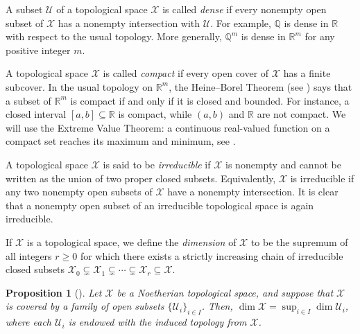 \documentclass[a4,12pt]{amsart}
\numberwithin{equation}{section} %
\newtheorem{proposition}[theorem]{Proposition} %
\theoremstyle{definition} %
\begin{document}
A subset $\mathcal{U}$ of a topological space $\mathcal{X}$ is called \emph{dense} if every nonempty open subset of $\mathcal{X}$ has a nonempty intersection with $\mathcal{U}$. For example, $\mathbb{Q}$ is dense in $\mathbb{R}$ with respect to the usual topology. 
More generally, $\mathbb{Q}^m$ is dense in $\mathbb{R}^m$ for any positive integer $m$.

A topological space $\mathcal{X}$ is called \emph{compact} if every open cover of $\mathcal{X}$ has a finite subcover. In the usual topology on $\mathbb{R}^m$, the Heine--Borel Theorem (see \cite[Theorem 2.41]{Rudin-book-1976}) says that a subset of $\mathbb{R}^m$ is compact if and only if it is closed and bounded. For instance, a closed interval $[a,b]\subseteq\mathbb{R}$ is compact, while $(a,b)$ and $\mathbb{R}$ are not compact. We will use the Extreme Value Theorem: a continuous real-valued function on a compact set reaches its maximum and minimum, see \cite[Theorem~4.16]{Rudin-book-1976}. 

A topological space $\mathcal{X}$ is said to be \emph{irreducible} if $\mathcal{X}$ is nonempty and cannot be written as the union of two proper closed subsets. Equivalently, $\mathcal{X}$ is irreducible if any two nonempty open subsets of $\mathcal{X}$ have a nonempty intersection. It is clear that a nonempty open subset of an irreducible topological space is again irreducible. 

If $\mathcal{X}$ is a topological space, we define the \emph{dimension} of $\mathcal{X}$ to be the supremum of all integers $r\geq0$ for which there exists a strictly increasing chain of irreducible closed subsets $\mathcal{X}_0\subsetneq \mathcal{X}_1\subsetneq\cdots\subsetneq \mathcal{X}_r\subseteq \mathcal{X}$.

\begin{proposition}[{\cite{Hartshorne-book-1977}}]\label{prop::dimension-open-cover}
Let $\mathcal{X}$ be a Noetherian topological space, and suppose that $\mathcal{X}$ is covered by a family of open subsets $\{\mathcal{U}_i\}_{i\in I}$. Then, $\dim \mathcal{X}=\sup_{i\in I}\dim \mathcal{U}_i$, where each $\mathcal{U}_i$ is endowed with the induced topology from $\mathcal{X}$.
\end{proposition}
\end{document}
